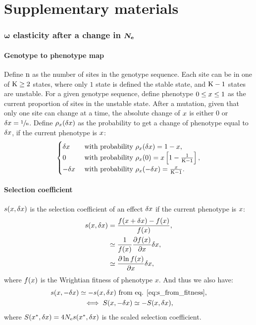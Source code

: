 \documentclass{article}
\begin{document}
\part*{Supplementary materials}
\tableofcontents
\section{$\bm{\omega}$ elasticity after a change in $\bm{N_{\mathrm{e}}}$}
\subsection{Genotype to phenotype map}
Define $\text{n}$ as the number of sites in the genotype sequence.
Each site can be in one of $\text{K} \geq 2$ states, where only $1$ state is defined the stable state, and $\text{K} - 1$ states are unstable.
For a given genotype sequence, define phenotype $0 \leq x \leq 1$ as the current proportion of sites in the unstable state.
After a mutation, given that only one site can change at a time, the absolute change of $x$ is either $0$ or $\delta x=\sfrac{1}{\text{n}}$.
Define $\rho_{x}(\delta x)$ as the probability to get a change of phenotype equal to $\delta x$, if the current phenotype is $x$:\\
\begin{gather}
\begin{cases}
\delta x &\text{ with probability } \rho_{x}(\delta x) = 1-x, \\
0 &\text{ with probability } \rho_{x}(0) = x \left[1 - \frac{1}{\text{K} - 1}\right], \\
-\delta x &\text{ with probability } \rho_{x}(-\delta x) = \frac{x}{\text{K} - 1}.\\
\end{cases} \label{eq:proba}
\end{gather}

\subsection{Selection coefficient}
$s(x, \delta x)$ is the selection coefficient of an effect $\delta x$ if the current phenotype is $x$:
\begin{align}
s(x, \delta x) &= \frac{f(x + \delta x) - f(x)}{f( x)}, \\
 &\simeq \frac{1}{f(x)}\frac{ \partial f(x) }{\partial x} \delta x, \\
 &\simeq \frac{ \partial \ln f(x) }{\partial x} \delta x, \label{eq:s_from_fitness}
\end{align}
where $f( x)$ is the Wrightian fitness of phenotype $x$. And thus we also have:
\begin{gather}
s(x, -\delta x) \simeq - s(x, \delta x) \text{ from eq. \ref{eq:s_from_fitness}} \label{eq:s_minus_deltax}, \\
\iff S(x, -\delta x) \simeq - S(x, \delta x), \label{eq:S_minus_deltax}
\end{gather}
where $S(x^{*}, \delta x) = 4N_{\mathrm{e}} s (x^{*}, \delta x)$ is the scaled selection coefficient.
\end{document}
